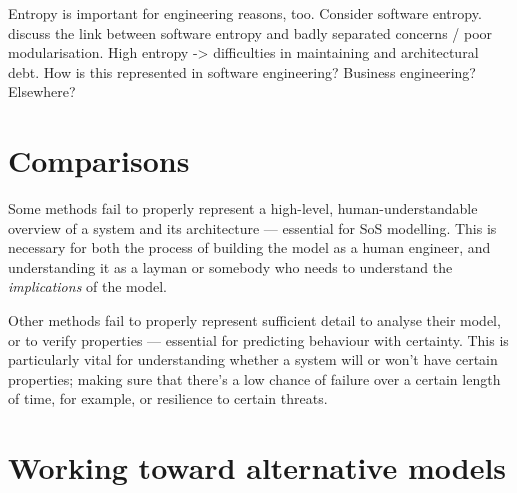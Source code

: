 \documentclass[draft,12pt]{article}
\begin{document}
Entropy is important for engineering reasons, too. Consider software entropy.
discuss the link between software entropy and badly separated concerns / poor modularisation.
High entropy -> difficulties in maintaining and architectural debt.
How is this represented in software engineering? Business engineering? Elsewhere?
\par


  

\section{Comparisons}

Some methods fail to properly represent a high-level, human-understandable overview of a system and its architecture --- essential for SoS modelling.
This is necessary for both the process of building the model as a human engineer, and understanding it as a layman or somebody who needs to understand the \emph{implications} of the model.
\par

Other methods fail to properly represent sufficient detail to analyse their model, or to verify properties --- essential for predicting behaviour with certainty.
This is particularly vital for understanding whether a system will or won't have certain properties; making sure that there's a low chance of failure over a certain length of time, for example, or resilience to certain threats.
\par















\section{Working toward alternative models}
\end{document}
